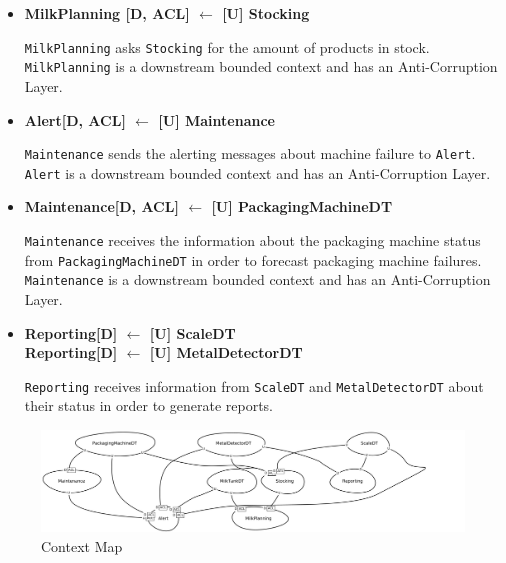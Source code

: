 \begin{itemize}
    \item \textbf{MilkPlanning [D, ACL] $\leftarrow$  [U] Stocking} 
    
    \texttt{MilkPlanning} asks \texttt{Stocking} for the amount of products in stock.
    \texttt{MilkPlanning} is a downstream bounded context and has an Anti-Corruption Layer.

    \item \textbf{Alert[D, ACL] $\leftarrow$  [U] Maintenance}
    
    \texttt{Maintenance} sends the alerting messages about machine failure to \texttt{Alert}.
    \texttt{Alert} is a downstream bounded context and has an Anti-Corruption Layer.

	\item \textbf{Maintenance[D, ACL] $\leftarrow$  [U] PackagingMachineDT}
	
    \texttt{Maintenance} receives the information about the packaging machine status from \texttt{PackagingMachineDT} in order to forecast packaging machine failures.
    \texttt{Maintenance} is a downstream bounded context and has an Anti-Corruption Layer.

	\item \textbf{Reporting[D] $\leftarrow$  [U] ScaleDT \\
    Reporting[D] $\leftarrow$  [U] MetalDetectorDT }

    \texttt{Reporting} receives information from \texttt{ScaleDT} and \texttt{MetalDetectorDT} about their status in order to generate reports.
	

\end{itemize}

\begin{figure}[H]
    \centering
    \includegraphics[width=\textwidth]{img/context-map.png}
    \caption{Context Map}
    \label{img:context-map}
\end{figure}


